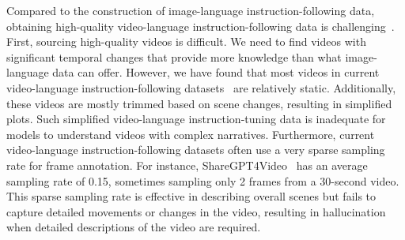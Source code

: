 Compared to the construction of image-language instruction-following data, obtaining high-quality video-language instruction-following data is challenging~\citep{damonlpsg2023videollama,li2024videochatchatcentricvideounderstanding}. First, sourcing high-quality videos is difficult. We need to find videos with significant temporal changes that provide more knowledge than what image-language data can offer. However, we have found that most videos in current video-language instruction-following datasets~\citep{chen2024sharegpt4video,zhang2024direct} are relatively static. Additionally, these videos are mostly trimmed based on scene changes, resulting in simplified plots. Such simplified video-language instruction-tuning data is inadequate for models to understand videos with complex narratives. Furthermore, current video-language instruction-following datasets often use a very sparse sampling rate for frame annotation. For instance, ShareGPT4Video~\citep{chen2024sharegpt4video} has an average sampling rate of 0.15, sometimes sampling only 2 frames from a 30-second video. 
This sparse sampling rate is effective in describing overall scenes but fails to capture detailed movements or changes in the video, resulting in hallucination  when detailed descriptions of the video are required.

